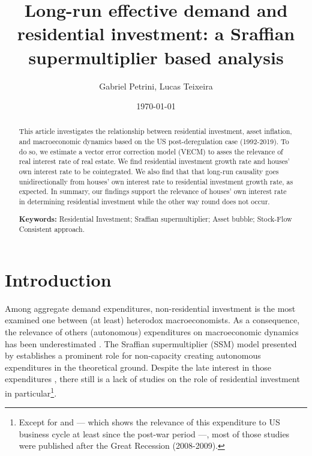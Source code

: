 \documentclass[11pt]{article}
\author{Gabriel Petrini, Lucas Teixeira}
\date{\today}
\title{Long-run effective demand and residential investment: a Sraffian supermultiplier based analysis}
\begin{document}
\maketitle
\begin{abstract}
This article investigates the relationship between residential investment, asset inflation, and macroeconomic dynamics based on
the US post-deregulation case (1992-2019). To do so, we estimate a vector error correction model (VECM) to asses the relevance of
real interest rate of real estate. We find residential investment growth rate and houses’ own interest rate to be cointegrated. We
also find that that long-run causality goes unidirectionally from houses’ own interest rate to residential investment growth rate,
as expected. In summary, our findings support the relevance of houses’ own interest rate in determining residential investment
while the other way round does not occur.

\noindent \textbf{Keywords:} Residential Investment; Sraffian supermultiplier; Asset bubble;  Stock-Flow Consistent approach.
\end{abstract}


\section{Introduction}
\label{sec:org505ec3c}
\label{sec:Introduction}
Among aggregate demand expenditures, non-residential investment is the most examined  one between (at least) heterodox macroeconomists.
As a consequence, the relevance of others (autonomous) expenditures on macroeconomic dynamics has been underestimated \cite{brochier_macroeconomics_2017}.
The Sraffian supermultiplier (SSM) model presented by \textcite{serrano_long_1995} establishes a prominent role for non-capacity creating autonomous expenditures in the theoretical ground.
Despite the late interest in those expenditures \cites{freitas_pattern_2013}{girardi_long-run_2016}{girardi_autonomous_2018}{braga_investment_2018}, there still is a lack of studies on the role of residential investment in particular\footnote{Except for \textcite{green_follow_1997} and \textcite{leamer_housing_2007} --- which shows the relevance of this expenditure to US business cycle at least since the post-war period ---, most of those studies were published after the Great Recession (2008-2009).}. 
\end{document}
